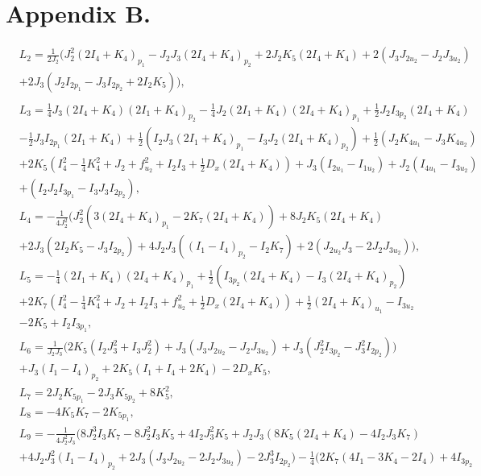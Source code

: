 \documentclass[12pt]{article}
\begin{document}
\section*{Appendix B.}
\begin{equation}
\begin{aligned}
&L_2=\frac{1}{2J_2}\bigg(J_2^2(2I_4+K_4)_{p_1}-J_2J_3(2I_4+K_4)_{p_2}+2J_2K_5(2I_4+K_4)+2(J_3J_{2u_2}-J_2J_{3u_2})\\&+2J_3(J_2I_{2p_1}-J_3I_{2p_2}+2I_2K_5)\bigg),\\
\end{aligned}\end{equation}
\begin{equation}
\begin{aligned}
&L_3=\frac{1}{4}J_3(2I_4+K_4)(2I_1+K_4)_{p_2}-\frac{1}{4}J_2(2I_1+K_4)(2I_4+K_4)_{p_1}+\frac{1}{2}J_2I_{3p_2}(2I_4+K_4)\\
&-\frac{1}{2}J_3I_{2p_1}(2I_1+K_4)+\frac{1}{2}(I_2J_3(2I_1+K_4)_{p_1}-I_3J_2(2I_4+K_4)_{p_2})+\frac{1}{2}(J_2K_{4u_1}-J_3K_{4u_2})\\
&+2K_5(I_4^2-\frac{1}{4}K_4^2+J_2+f^2_{u_2}+I_2I_3+\frac{1}{2}D_x(2I_4+K_4))+J_3(I_{2u_1}-I_{1u_2})+J_2(I_{4u_1}-I_{3u_2})\\
&+(I_2J_2I_{3p_1}-I_3J_3I_{2p_2}),\\
&L_4=-\frac{1}{4J_2^2}\bigg(J_2^2(3(2I_4+K_4)_{p_1}-2K_7(2I_4+K_4))+8J_2K_5(2I_4+K_4)\\
&+2J_3(2I_2K_5-J_3I_{2p_2})+4J_2J_3((I_1-I_4)_{p_2}-I_2K_7)+2(J_{2u_2}J_3-2J_2J_{3u_2})\bigg),\\
&L_5=-\frac{1}{4}(2I_1+K_4)(2I_4+K_4)_{p_1}+\frac{1}{2}(I_{3p_2}(2I_4+K_4)-I_3(2I_4+K_4)_{p_2})\\
&+2K_7(I_4^2-\frac{1}{4}K_4^2+J_2+I_2I_3+f^2_{u_2}+\frac{1}{2}D_x(2I_4+K_4))+\frac{1}{2}(2I_4+K_4)_{u_1}-I_{3u_2}\\
&-2K_5+I_2I_{3p_1},\\
&L_6=\frac{1}{J_2J_3}\bigg(2K_5(I_2J_3^2+I_3J_2^2)+J_3(J_3J_{2u_2}-J_2J_{3u_2})+J_3(J_2^2I_{3p_2}-J_3^2I_{2p_2})\bigg)\\
&+J_3(I_1-I_4)_{p_2}+2K_5(I_1+I_4+2K_4)-2D_xK_5,\\
&L_7=2J_2K_{5p_1}-2J_3K_{5p_2}+8K_5^2,\\
&L_8=-4K_5K_7-2K_{5p_1},\\
&L_9=-\frac{1}{4J_2^2J_3}\bigg(8J_2^3I_3K_7-8J_2^2I_3K_5+4I_2J_3^2K_5+J_2J_3(8K_5(2I_4+K_4)-4I_2J_3K_7)\\
&+4J_2J_3^2(I_1-I_4)_{p_2}+2J_3(J_3J_{2u_2}-2J_2J_{3u_2})-2J_3^3I_{2p_2}\bigg)-\frac{1}{4}\bigg(2K_7(4I_1-3K_4-2I_4)+4I_{3p_2}\\

\end{aligned}
\end{equation}
\end{document}
